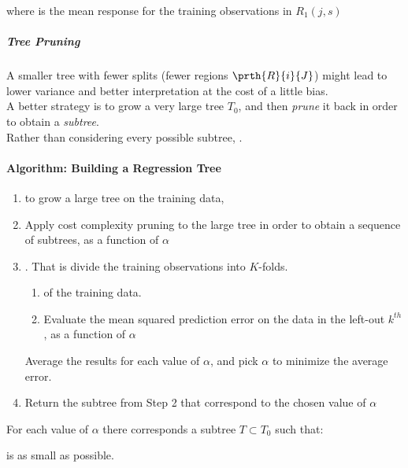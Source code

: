 \begin{center}
\end{center}
where  is the mean response for the 
training observations in $R_{1}(j,s)$  

\subparagraph{Tree Pruning}
A smaller tree with fewer splits (fewer regions $\prth{R}{i}{J}$) might
lead to lower variance and better interpretation at the cost of a 
little bias.\\ A better strategy is to grow a very large tree $T_{0}$,
and then \emph{prune} it back in order to obtain a \emph{subtree}.\\
Rather than considering every possible subtree, .

\paragraph{Algorithm: Building a Regression Tree}
\begin{enumerate}
	\item {} to grow a large tree on 
		the training data, 
	\item Apply cost complexity pruning to the large tree in order
		to obtain a sequence of subtrees, as a function of 
		$\alpha$
	\item {}.
		That is divide the training observations into $K$-folds.
		\begin{enumerate}[label=\Alph*]
			\item {} of the training data.
			\item Evaluate the mean squared prediction 
				error on the data in the left-out 
				$k^{th}$, as a function of $\alpha$
		\end{enumerate}
		Average the results for each value of $\alpha$, and
		pick $\alpha$ to minimize the average error.
	\item Return the subtree from Step 2 that correspond to the
		chosen value of $\alpha$
\end{enumerate}

For each value of $\alpha$ there corresponds a subtree $T\subset T_{0}$
such that:
\begin{center}
\end{center}
is as small as possible. 

